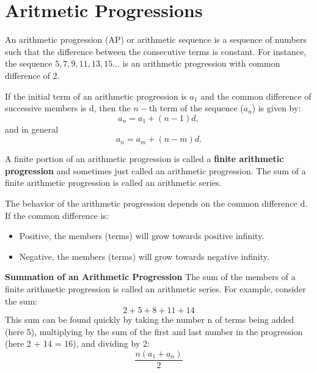 \documentclass[12pt]{article}
\begin{document}
\section{Aritmetic Progressions}

An arithmetic progression (AP) or arithmetic sequence is a sequence of numbers such that the difference between the consecutive terms is constant. For instance, the sequence $5, 7, 9, 11, 13, 15 \ldots$ is an arithmetic progression with common difference of 2.



If the initial term of an arithmetic progression is $a_{1}$ and the common difference of successive members is d, then the $n-$th term of the sequence ($a_{n}$) is given by:
\[ a_{n}=a_{1}+(n-1)d, \] 
and in general
\[ a_{n}=a_{m}+(n-m)d.\]



A finite portion of an arithmetic progression is called a \textbf{finite arithmetic progression} and sometimes just called an arithmetic progression. The sum of a finite arithmetic progression is called an arithmetic series.
\newline



The behavior of the arithmetic progression depends on the common difference d. If the common difference is:
\begin{itemize}
\item Positive, the members (terms) will grow towards positive infinity.
\item Negative, the members (terms) will grow towards negative infinity.
\end{itemize}



\textbf{Summation of an Arithmetic Progression}
The sum of the members of a finite arithmetic progression is called an arithmetic series. For example, consider the sum:
\[2+5+8+11+14\]
This sum can be found quickly by taking the number n of terms being added (here 5), multiplying by the sum of the first and last number in the progression (here 2 + 14 = 16), and dividing by 2:
\[{\frac  {n(a_{1}+a_{n})}{2}}\]
\end{document}
